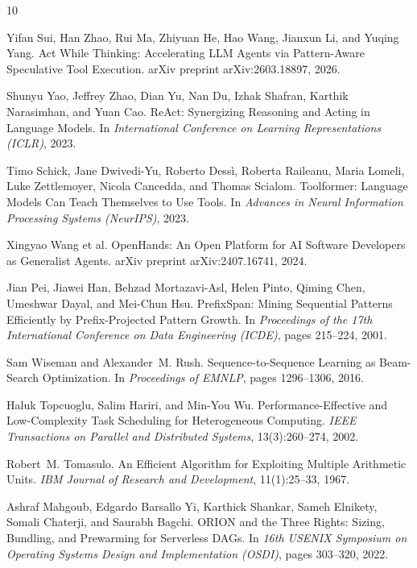 \documentclass[10pt,twocolumn]{article}
\begin{document}

\begin{thebibliography}{10}

Yifan Sui, Han Zhao, Rui Ma, Zhiyuan He, Hao Wang, Jianxun Li, and Yuqing Yang.
\newblock Act While Thinking: Accelerating LLM Agents via Pattern-Aware Speculative Tool Execution.
\newblock arXiv preprint arXiv:2603.18897, 2026.

Shunyu Yao, Jeffrey Zhao, Dian Yu, Nan Du, Izhak Shafran, Karthik Narasimhan, and Yuan Cao.
\newblock ReAct: Synergizing Reasoning and Acting in Language Models.
\newblock In \emph{International Conference on Learning Representations (ICLR)}, 2023.

Timo Schick, Jane Dwivedi-Yu, Roberto Dess\`i, Roberta Raileanu, Maria Lomeli, Luke Zettlemoyer, Nicola Cancedda, and Thomas Scialom.
\newblock Toolformer: Language Models Can Teach Themselves to Use Tools.
\newblock In \emph{Advances in Neural Information Processing Systems (NeurIPS)}, 2023.

Xingyao Wang et al.
\newblock OpenHands: An Open Platform for AI Software Developers as Generalist Agents.
\newblock arXiv preprint arXiv:2407.16741, 2024.

Jian Pei, Jiawei Han, Behzad Mortazavi-Asl, Helen Pinto, Qiming Chen, Umeshwar Dayal, and Mei-Chun Hsu.
\newblock PrefixSpan: Mining Sequential Patterns Efficiently by Prefix-Projected Pattern Growth.
\newblock In \emph{Proceedings of the 17th International Conference on Data Engineering (ICDE)}, pages 215--224, 2001.

Sam Wiseman and Alexander~M. Rush.
\newblock Sequence-to-Sequence Learning as Beam-Search Optimization.
\newblock In \emph{Proceedings of EMNLP}, pages 1296--1306, 2016.

Haluk Topcuoglu, Salim Hariri, and Min-You Wu.
\newblock Performance-Effective and Low-Complexity Task Scheduling for Heterogeneous Computing.
\newblock \emph{IEEE Transactions on Parallel and Distributed Systems}, 13(3):260--274, 2002.

Robert~M. Tomasulo.
\newblock An Efficient Algorithm for Exploiting Multiple Arithmetic Units.
\newblock \emph{IBM Journal of Research and Development}, 11(1):25--33, 1967.

Ashraf Mahgoub, Edgardo Barsallo Yi, Karthick Shankar, Sameh Elnikety, Somali Chaterji, and Saurabh Bagchi.
\newblock ORION and the Three Rights: Sizing, Bundling, and Prewarming for Serverless DAGs.
\newblock In \emph{16th USENIX Symposium on Operating Systems Design and Implementation (OSDI)}, pages 303--320, 2022.


\end{thebibliography}
\end{document}
